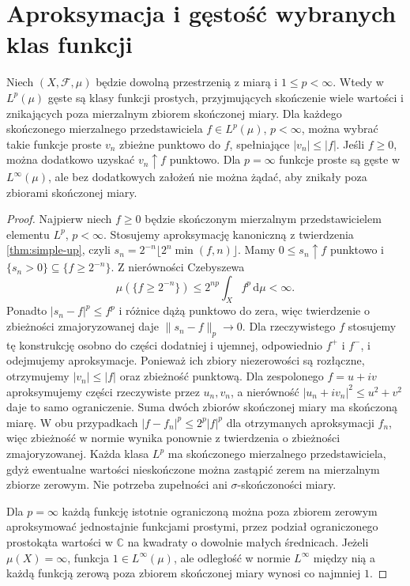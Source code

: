 \section{Aproksymacja i gęstość wybranych klas funkcji}

\begin{twierdzenie}
\label{thm:simple-dense-lp-14}
Niech $(X,\mathcal F,\mu)$ będzie dowolną przestrzenią
z miarą i $1\le p<\infty$. Wtedy w $L^p(\mu)$ gęste są
klasy funkcji prostych, przyjmujących skończenie wiele
wartości i znikających poza mierzalnym zbiorem skończonej miary.
Dla każdego skończonego mierzalnego przedstawiciela
$f\in L^p(\mu)$, $p<\infty$, można wybrać takie
funkcje proste $v_n$ zbieżne punktowo do $f$,
spełniające $|v_n|\le |f|$. Jeśli $f\ge0$,
można dodatkowo uzyskać $v_n\uparrow f$ punktowo.
Dla $p=\infty$ funkcje proste są gęste w $L^\infty(\mu)$,
ale bez dodatkowych założeń nie można żądać, aby
znikały poza zbiorami skończonej miary.
\end{twierdzenie}
\begin{proof}
Najpierw niech $f\ge0$ będzie skończonym mierzalnym
przedstawicielem elementu $L^p$, $p<\infty$.
Stosujemy aproksymację kanoniczną z twierdzenia
\ref{thm:simple-up}, czyli
$s_n=2^{-n}\lfloor2^n\min(f,n)\rfloor$.
Mamy $0\le s_n\uparrow f$ punktowo i
$\{s_n>0\}\subseteq\{f\ge2^{-n}\}$.
Z nierówności Czebyszewa
\[
 \mu(\{f\ge2^{-n}\})\le
 2^{np}\int_X f^p\,\mathrm d\mu<\infty.
\]
Ponadto $|s_n-f|^p\le f^p$ i różnice dążą punktowo
do zera, więc twierdzenie o zbieżności zmajoryzowanej
daje $\|s_n-f\|_p\to0$.
Dla rzeczywistego $f$ stosujemy tę konstrukcję
osobno do części dodatniej i ujemnej, odpowiednio $f^+$ i $f^-$,
i odejmujemy aproksymacje.
Ponieważ ich zbiory niezerowości są rozłączne,
otrzymujemy $|v_n|\le|f|$ oraz zbieżność punktową.
Dla zespolonego $f=u+iv$ aproksymujemy części
rzeczywiste przez $u_n,v_n$, a nierówność
$|u_n+iv_n|^2\le u^2+v^2$ daje to samo ograniczenie.
Suma dwóch zbiorów skończonej miary ma skończoną
miarę. W obu przypadkach
$|f-f_n|^p\le 2^p|f|^p$ dla otrzymanych aproksymacji
$f_n$, więc zbieżność w normie wynika ponownie
z twierdzenia o zbieżności zmajoryzowanej.
Każda klasa $L^p$ ma skończonego mierzalnego
przedstawiciela, gdyż ewentualne wartości nieskończone
można zastąpić zerem na mierzalnym zbiorze zerowym.
Nie potrzeba zupełności ani $\sigma$-skończoności miary.

Dla $p=\infty$ każdą funkcję istotnie ograniczoną
można poza zbiorem zerowym aproksymować
jednostajnie funkcjami prostymi, przez podział
ograniczonego prostokąta wartości w $\mathbb C$
na kwadraty o dowolnie małych średnicach.
Jeżeli $\mu(X)=\infty$, funkcja $1\in L^\infty(\mu)$,
ale odległość w normie $L^\infty$ między nią
a każdą funkcją zerową poza zbiorem skończonej
miary wynosi co najmniej $1$.
\end{proof}


